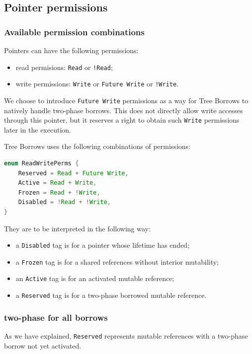\documentclass[a4paper,11pt]{article}
\theoremstyle{plain}
\theoremstyle{definition}
\theoremstyle{remark}
\newcommand{\tperm}[1]{\texttt{#1}}
\begin{document}
\subsection{Pointer permissions}

\subsubsection{Available permission combinations}

Pointers can have the following permissions:
\begin{itemize}
    \item read permisions: \tperm{Read} or \tperm{!Read};
    \item write permissions: \tperm{Write} or \tperm{Future Write} or \tperm{!Write}.
\end{itemize}

We choose to introduce \tperm{Future Write} permissions as a way for Tree Borrows to
natively handle two-phase borrows.
This does not directly allow write accesses through this pointer, but it reserves
a right to obtain such \tperm{Write} permissions later in the execution.

Tree Borrows uses the following combinations of permissions:
\begin{lstlisting}[language=rust]
enum ReadWritePerms {
    Reserved = Read + Future Write,
    Active = Read + Write,
    Frozen = Read + !Write,
    Disabled = !Read + !Write,
}
\end{lstlisting}

They are to be interpreted in the following way:
\begin{itemize}
    \item a \tperm{Disabled} tag is for a pointer whose lifetime has ended;
    \item a \tperm{Frozen} tag is for a shared references without interior mutability;
    \item an \tperm{Active} tag is for an activated mutable reference;
    \item a \tperm{Reserved} tag is for a two-phase borrowed mutable reference.
\end{itemize}

\subsubsection{two-phase for all borrows}

As we have explained, \tperm{Reserved} represents mutable references with
a two-phase borrow not yet activated.
\end{document}

